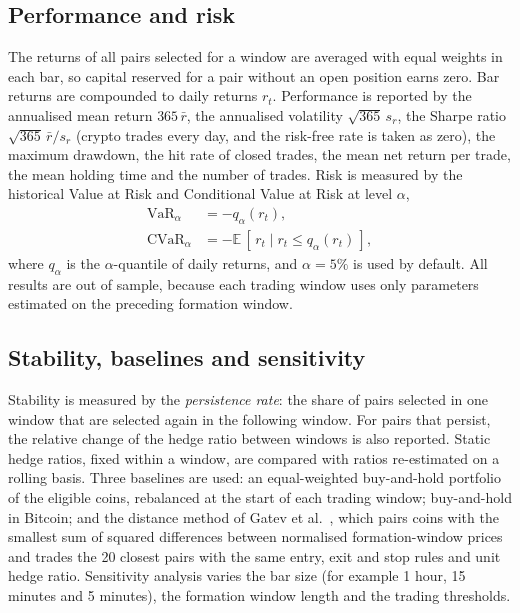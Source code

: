 \documentclass[10pt,a4paper,twocolumn]{article}
\begin{document}
	\subsection{Performance and risk}
	\label{sec:perf}
	The returns of all pairs selected for a window are averaged with equal weights in each bar, so capital reserved for a pair without an open position earns zero. Bar returns are compounded to daily returns $r_t$. Performance is reported by the annualised mean return $365\,\bar r$, the annualised volatility $\sqrt{365}\,s_r$, the Sharpe ratio $\sqrt{365}\,\bar r/s_r$ (crypto trades every day, and the risk-free rate is taken as zero), the maximum drawdown, the hit rate of closed trades, the mean net return per trade, the mean holding time and the number of trades. Risk is measured by the historical Value at Risk and Conditional Value at Risk at level $\alpha$,
	\begin{align}
		\mathrm{VaR}_\alpha &=-q_\alpha(r_t),\label{eq:var}\\
		\mathrm{CVaR}_\alpha &=-\mathbb{E}\,[\,r_t\mid r_t\le q_\alpha(r_t)\,],\label{eq:cvar}
	\end{align}
	where $q_\alpha$ is the $\alpha$-quantile of daily returns, and $\alpha=5\%$ is used by default. All results are out of sample, because each trading window uses only parameters estimated on the preceding formation window.
	
	\subsection{Stability, baselines and sensitivity}
	\label{sec:stability}
	Stability is measured by the \emph{persistence rate}: the share of pairs selected in one window that are selected again in the following window. For pairs that persist, the relative change of the hedge ratio between windows is also reported. Static hedge ratios, fixed within a window, are compared with ratios re-estimated on a rolling basis. Three baselines are used: an equal-weighted buy-and-hold portfolio of the eligible coins, rebalanced at the start of each trading window; buy-and-hold in Bitcoin; and the distance method of Gatev et al.\ \cite{gatev2006}, which pairs coins with the smallest sum of squared differences between normalised formation-window prices and trades the 20 closest pairs with the same entry, exit and stop rules and unit hedge ratio. Sensitivity analysis varies the bar size (for example 1 hour, 15 minutes and 5 minutes), the formation window length and the trading thresholds.
	
\end{document}
